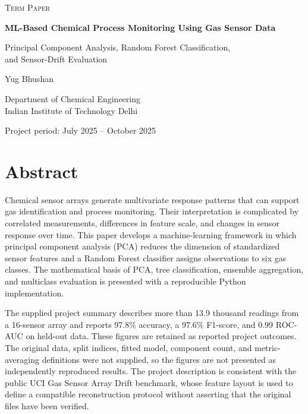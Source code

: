 \documentclass[11pt,a4paper]{article}
\begin{document}
\begin{titlepage}\centering\vspace*{22mm}
{\Large\scshape Term Paper\par}\vspace{16mm}
{\huge\bfseries ML-Based Chemical Process Monitoring Using Gas Sensor Data\par}\vspace{10mm}
{\large Principal Component Analysis, Random Forest Classification,\\and Sensor-Drift Evaluation\par}\vspace{24mm}
{\Large Yug Bhushan\par}\vspace{3mm}{\large 2025CH71601\par}\vspace{7mm}
Department of Chemical Engineering\\Indian Institute of Technology Delhi
\vfill{\large Project period: July 2025 -- October 2025\par}\vspace{12mm}
\end{titlepage}

\section*{Abstract}
Chemical sensor arrays generate multivariate response patterns that can support gas identification and process monitoring. Their interpretation is complicated by correlated measurements, differences in feature scale, and changes in sensor response over time. This paper develops a machine-learning framework in which principal component analysis (PCA) reduces the dimension of standardized sensor features and a Random Forest classifier assigns observations to six gas classes. The mathematical basis of PCA, tree classification, ensemble aggregation, and multiclass evaluation is presented with a reproducible Python implementation.

The supplied project summary describes more than 13.9 thousand readings from a 16-sensor array and reports 97.8\% accuracy, a 97.6\% F1-score, and 0.99 ROC-AUC on held-out data. These figures are retained as reported project outcomes. The original data, split indices, fitted model, component count, and metric-averaging definitions were not supplied, so the figures are not presented as independently reproduced results. The project description is consistent with the public UCI Gas Sensor Array Drift benchmark, whose feature layout is used to define a compatible reconstruction protocol without asserting that the original files have been verified.
\end{document}
